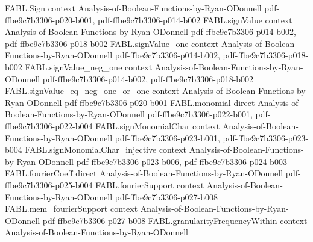 \begin{theorem}
\label{FABL.normalizedCorrelatedSignSumMeasure_tendsto_correlatedGaussian}
\leanok
{}
\proofstep
  {FABL.Sign}
  {context}
  {Analysis-of-Boolean-Functions-by-Ryan-ODonnell}
  {pdf-ffbe9c7b3306-p020-b001,
    pdf-ffbe9c7b3306-p014-b002}
\proofstep
  {FABL.signValue}
  {context}
  {Analysis-of-Boolean-Functions-by-Ryan-ODonnell}
  {pdf-ffbe9c7b3306-p014-b002,
    pdf-ffbe9c7b3306-p018-b002}
\proofstep
  {FABL.signValue_one}
  {context}
  {Analysis-of-Boolean-Functions-by-Ryan-ODonnell}
  {pdf-ffbe9c7b3306-p014-b002,
    pdf-ffbe9c7b3306-p018-b002}
\proofstep
  {FABL.signValue_neg_one}
  {context}
  {Analysis-of-Boolean-Functions-by-Ryan-ODonnell}
  {pdf-ffbe9c7b3306-p014-b002,
    pdf-ffbe9c7b3306-p018-b002}
\proofstep
  {FABL.signValue_eq_neg_one_or_one}
  {context}
  {Analysis-of-Boolean-Functions-by-Ryan-ODonnell}
  {pdf-ffbe9c7b3306-p020-b001}
\proofstep
  {FABL.monomial}
  {direct}
  {Analysis-of-Boolean-Functions-by-Ryan-ODonnell}
  {pdf-ffbe9c7b3306-p022-b001,
    pdf-ffbe9c7b3306-p022-b004}
\proofstep
  {FABL.signMonomialChar}
  {context}
  {Analysis-of-Boolean-Functions-by-Ryan-ODonnell}
  {pdf-ffbe9c7b3306-p023-b001,
    pdf-ffbe9c7b3306-p023-b004}
\proofstep
  {FABL.signMonomialChar_injective}
  {context}
  {Analysis-of-Boolean-Functions-by-Ryan-ODonnell}
  {pdf-ffbe9c7b3306-p023-b006,
    pdf-ffbe9c7b3306-p024-b003}
\proofstep
  {FABL.fourierCoeff}
  {direct}
  {Analysis-of-Boolean-Functions-by-Ryan-ODonnell}
  {pdf-ffbe9c7b3306-p025-b004}
\proofstep
  {FABL.fourierSupport}
  {context}
  {Analysis-of-Boolean-Functions-by-Ryan-ODonnell}
  {pdf-ffbe9c7b3306-p027-b008}
\proofstep
  {FABL.mem_fourierSupport}
  {context}
  {Analysis-of-Boolean-Functions-by-Ryan-ODonnell}
  {pdf-ffbe9c7b3306-p027-b008}
\proofstep
  {FABL.granularityFrequencyWithin}
  {context}
  {Analysis-of-Boolean-Functions-by-Ryan-ODonnell}

\end{theorem}
